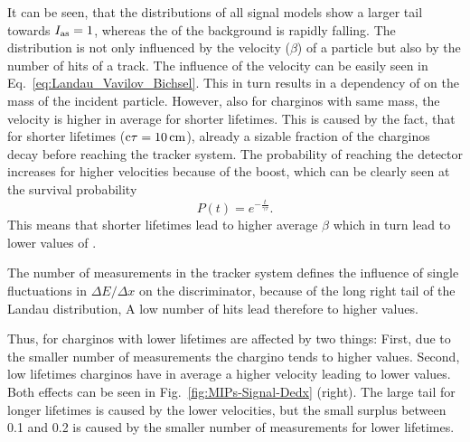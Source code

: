 It can be seen, that the \ias distributions of all signal models show a larger tail towards $I_{\text{as}}=1$, whereas the \ias of the background is rapidly falling.
The \ias distribution is not only influenced by the velocity ($\beta$) of a particle but also by the number of hits of a track.
The influence of the velocity can be easily seen in Eq.~\ref{eq:Landau_Vavilov_Bichsel}. 
This in turn results in a dependency of \ias on the mass of the incident particle.
However, also for charginos with same mass, the velocity is higher in average for shorter lifetimes.
This is caused by the fact, that for shorter lifetimes (\eg $\text{c}\tau=10\,\text{cm}$), already a sizable fraction of the charginos decay before reaching the tracker system.
The probability of reaching the detector increases for higher velocities because of the boost, which can be clearly seen at the survival probability
\begin{equation}
P \left( t \right) = e^{-\frac{t}{\gamma \tau}}.
\end{equation} 
This means that shorter lifetimes lead to higher average $\beta$ which in turn lead to lower values of \ias.

The number of measurements in the tracker system defines the influence of single fluctuations in $\Delta E/\Delta x$ on the \ias discriminator, because of the long right tail of the Landau distribution, A low number of hits lead therefore to higher \ias values.

Thus, \ias for charginos with lower lifetimes are affected by two things: 
First, due to the smaller number of measurements the chargino tends to higher \ias values.
Second, low lifetimes charginos have in average a higher velocity leading to lower \ias values.
Both effects can be seen in Fig.~\ref{fig:MIPs-Signal-Dedx} (right).
The large tail for longer lifetimes is caused by the lower velocities, but the small surplus between 0.1 and 0.2 is caused by the smaller number of measurements for lower lifetimes.\\


